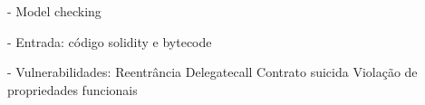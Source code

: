 
- Model checking

- Entrada: código solidity e bytecode

 - Vulnerabilidades:
    Reentrância
    Delegatecall
    Contrato suicida
    Violação de propriedades funcionais
    